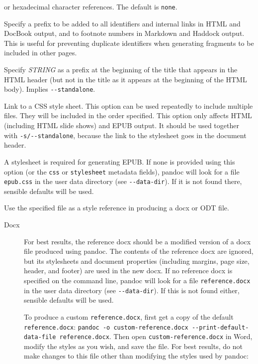 \documentclass[
  b5paper
]{book}
\begin{document}
\begin{description}
or hexadecimal character references. The default is \texttt{none}.
\item[\texttt{-\/-id-prefix=}\emph{STRING}]
Specify a prefix to be added to all identifiers and internal links in
HTML and DocBook output, and to footnote numbers in Markdown and Haddock
output. This is useful for preventing duplicate identifiers when
generating fragments to be included in other pages.
\item[\texttt{-T} \emph{STRING},
\texttt{-\/-title-prefix=}\emph{STRING}]
Specify \emph{STRING} as a prefix at the beginning of the title that
appears in the HTML header (but not in the title as it appears at the
beginning of the HTML body). Implies \texttt{-\/-standalone}.
\item[\texttt{-c} \emph{URL}, \texttt{-\/-css=}\emph{URL}]
Link to a CSS style sheet. This option can be used repeatedly to include
multiple files. They will be included in the order specified. This
option only affects HTML (including HTML slide shows) and EPUB output.
It should be used together with \texttt{-s/-\/-standalone}, because the
link to the stylesheet goes in the document header.

A stylesheet is required for generating EPUB. If none is provided using
this option (or the \texttt{css} or \texttt{stylesheet} metadata
fields), pandoc will look for a file \texttt{epub.css} in the user data
directory (see \texttt{-\/-data-dir}). If it is not found there,
sensible defaults will be used.
\item[\phantomsection\label{option--reference-doc}{\texttt{-\/-reference-doc=}\emph{FILE}\textbar{}\emph{URL}}]
Use the specified file as a style reference in producing a docx or ODT
file.

\begin{description}
\item[Docx]
For best results, the reference docx should be a modified version of a
docx file produced using pandoc. The contents of the reference docx are
ignored, but its stylesheets and document properties (including margins,
page size, header, and footer) are used in the new docx. If no reference
docx is specified on the command line, pandoc will look for a file
\texttt{reference.docx} in the user data directory (see
\texttt{-\/-data-dir}). If this is not found either, sensible defaults
will be used.

To produce a custom \texttt{reference.docx}, first get a copy of the
default \texttt{reference.docx}:
\texttt{pandoc\ -o\ custom-reference.docx\ -\/-print-default-data-file\ reference.docx}.
Then open \texttt{custom-reference.docx} in Word, modify the styles as
you wish, and save the file. For best results, do not make changes to
this file other than modifying the styles used by pandoc:


\end{description}
\end{description}
\end{document}
